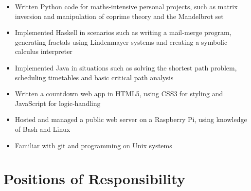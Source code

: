 \documentclass[11pt,a4paper,sans]{moderncv}        %
\begin{document}
\begin{itemize}

\item Written Python code for maths-intensive personal projects, such as matrix inversion and manipulation of coprime theory and the Mandelbrot set

\vspace{3pt}

\item Implemented Haskell in scenarios such as writing a mail-merge program, generating fractals using Lindenmayer systems and creating a symbolic calculus interpreter

\vspace{3pt}

\item Implemented Java in situations such as solving the shortest path problem, scheduling timetables and basic critical path analysis

\vspace{3pt}

\item{Written a countdown web app in HTML5, using CSS3 for styling and JavaScript for logic-handling}

\vspace{3pt}

\item Hosted and managed a public web server on a Raspberry Pi, using knowledge of Bash and Linux

\vspace{3pt}

\item Familiar with git and programming on Unix systems

\end{itemize}

\section{Positions of Responsibility}
\end{document}
